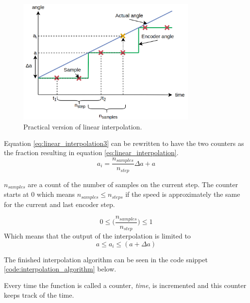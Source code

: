 \begin{figure}[H]
	\centering
	\includegraphics[width=0.8\textwidth]{pictures/software/angle_interpolation2.png}
	\caption{Practical version of linear interpolation.}
	\label{fig:angle_interpolation2}
\end{figure}







Equation \ref{eq:linear_interpolation3} can be rewritten to have the two counters as the fraction resulting in equation \ref{eq:linear_interpolation}.
\begin{equation}
a_{i} =  \frac{n_{samples}}{n_{step}} \Delta a  + a
\label{eq:linear_interpolation}
\end{equation}

$n_{samples}$ are a count of the number of samples on the current step. The counter starts at $0$ which means $n_{samples} \leq n_{steps}$ if the speed is approximately the same for the current and last encoder step.

\begin{equation}
	0 \leq	\Big(\frac{n_{samples}}{n_{step}} \Big) \leq 1
\end{equation}
Which means that the output of the interpolation is limited to
\begin{equation}
	 a \leq a_i \leq (a + \Delta a)
\end{equation}


The finished interpolation algorithm can be seen in the code snippet \ref{code:interpolation_algorithm} below. 

Every time the function is called a counter, \textit{time}, is incremented and this counter keeps track of the time.

